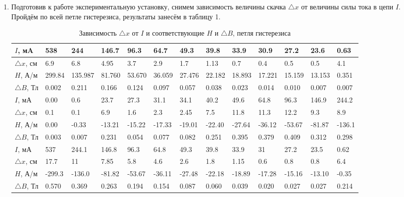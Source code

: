 \documentclass[a4paper]{article}
\begin{document}
\begin{enumerate}
    \item Подготовив к работе экспериментальную установку, снимем зависимость величины скачка $\triangle x$ от величины силы тока в цепи $I$. Пройдём по всей петле гистерезиса, результаты занесём в таблицу 1.
    
    \begin{table}[h]
    \centering
    \begin{center}
    \caption{Зависимость $\triangle x$ от $I$ и соответствующие $H$ и $\triangle B$, петля гистерезиса}
    \end{center}
    \vspace{0.1cm}
    \label{tab:my_label}
    \begin{tabular}{ |p{1.2cm}||p{1cm}|p{1cm}|p{1cm}|p{1cm}|p{1cm}|p{1cm}|p{1cm}|p{1cm}|p{1cm}|p{1cm}|p{1cm}|p{1cm}| }
 \hline
    $I$, мA & 538 & 244 & 146.7 & 96.3 & 64.7 & 49.3 & 39.8 & 33.9 & 30.9 & 27.2 & 23.6 & 0.63 \\
\hline
    $\triangle x$, см & 6.9 & 6.8 & 4.95 & 3.7 & 2.9 & 1.7 & 1.13 & 0.7 & 0.4 & 0.5 & 0.5 & 4.1 \\
\hline
    $H$, А/м & 299.84 & 135.987 & 81.760 & 53.670 & 36.059 & 27.476 & 22.182 & 18.893 & 17.221 & 15.159 & 13.153 & 0.351\\
\hline
    $\triangle B$, Тл & 0.002 & 0.211 & 0.166 & 0.124 & 0.097 & 0.057 & 0.038 & 0.023 & 0.014 & 0.010 & 0.007 & 0.007\\
\hline
\hline

    $I$, мА & 0.00 & 0.6 & 23.7 & 27.3 & 31.1 & 34.1 & 40.2 & 49.6 & 64.8 & 96.3 & 146.9 & 244.2 \\
\hline
    $\triangle x$, см & 0.1 & 0.1 & 6.9 & 1.6 & 2.3 & 2.45 & 7.5 & 11.8 & 11.3 & 12.2 & 9.3 & 8.9 \\
\hline
    $H$, А/м & 0.00 & -0.33 & -13.21 & -15.22 & -17.33 & -19.01 & -22.40 & -27.64 & -36.12 & -53.67 & -81.87 & -136.1 \\
\hline 
    $\triangle B$, Тл & 0.003 & 0.007 & 0.231 & 0.054 & 0.077 & 0.082 & 0.251 & 0.395 & 0.379 & 0.409 & 0.312 & 0.298 \\
    
\hline
\hline

    $I$, мА & 537 & 244.1 & 146.8 & 96.3 & 64.8 & 49.3 & 39.8 & 33.9 & 31 & 27.2 & 23.5 & 0.62 \\
\hline
    $\triangle x$, см & 17.7 & 11 & 7.85 & 5.8 & 4.6 & 2.6 & 1.8 & 1.15 & 0.6 & 0.8 & 0.8 & 6.4 \\
\hline
    $H$, А/м & -299.3 & -136.0 & -81.82 & -53.67 & -36.11 & -27.48 & -22.18 & -18.89 & -17.28 & -15.16 & -13.10 & -0.35\\
\hline 
    $\triangle B$, Тл & 0.570 & 0.369 & 0.263 & 0.194 & 0.154 & 0.087 & 0.060 & 0.039 & 0.020 & 0.027 & 0.027 & 0.214\\
\hline
\hline


\end{tabular}
\end{table}
\end{enumerate}
\end{document}
